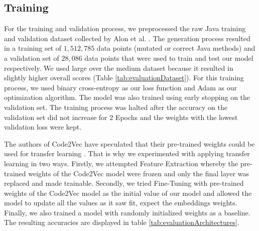 \subsection{Training}\label{sec:Training}
For the training and validation process, we preprocessed the raw Java training and validation dataset collected by Alon et al. \cite{code2seq}. The generation process resulted in a training set of $1,512,785$ data points (mutated or correct Java methods) and a validation set of $28,086$ data points that were used to train and test our model respectively. We used large over the medium dataset \cite{code2seq} because it resulted in slightly higher overall scores (Table \ref{tab:evaluationDataset}). 
For this training process, we used binary cross-entropy as our loss function and Adam \cite{kingma2014adam} as our optimization algorithm. The model was also trained using early stopping on the validation set. The training process was halted after the accuracy on the validation set did not increase for $2$ Epochs and the weights with the lowest validation loss were kept.

The authors of Code2Vec have speculated that their pre-trained weights could be used for transfer learning \cite{alon2019code2vec}. That is why we experimented with applying transfer learning in two ways. Firstly, we attempted Feature Extraction whereby the pre-trained weights of the Code2Vec model were frozen and only the final layer was replaced and made trainable. Secondly, we tried Fine-Tuning with pre-trained weights of the Code2Vec model as the initial value of our model and allowed the model to update all the values as it saw fit, expect the embeddings weights. Finally, we also trained a model with randomly initialized weights as a baseline. The resulting accuracies are displayed in table \ref{tab:evaluationArchitectures}.



